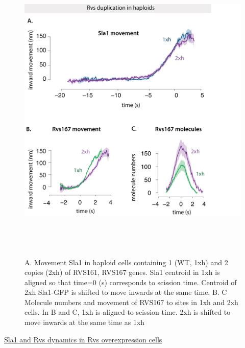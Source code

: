 	




				\begin{figure}[H]
	\centering
	\includegraphics[width=15cm,height=15cm,keepaspectratio]{figures/results_final/rvs_haploid4}
	\vspace*{2mm}
	\caption[Overexpression of Rvs in haploid cells]
	{A. Movement Sla1 in haploid cells containing 1 (WT, 1xh) and 2 copies (2xh) of RVS161, RVS167 genes. Sla1 centroid in 1xh is aligned so that time=0 (s) corresponds to scission time. Centroid of 2xh Sla1-GFP is shifted to move inwards at the same time. 
		B. C Molecule numbers and movement of RVS167 to sites in 1xh and 2xh cells. In B and C, 1xh is aligned to scission time. 2xh is shifted to move inwards at the same time as 1xh
		\label{fig_rvshaploid}}
	
\end{figure}
 \underline{Sla1 and Rvs dynamics in Rvs overexpression cells}
 
